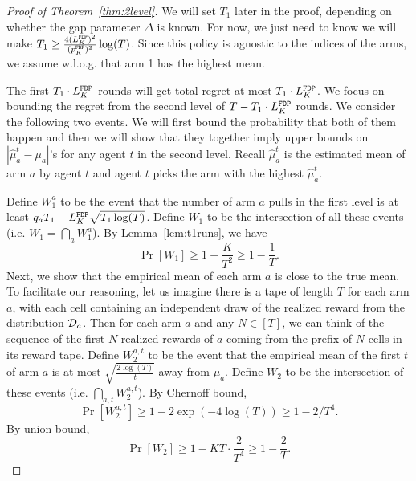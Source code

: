 \begin{proof}[Proof of Theorem~\ref{thm:2level}]
  We will set $T_1$ later in the proof, depending on whether the gap
  parameter $\Delta$ is known. For now, we just need to know we will
  make $T_1 \geq \frac{4(L^\mathtt{FDP}_K)^2}{(p^\mathtt{FDP}_K)^2}\log(T)$. Since this policy is
  agnostic to the indices of the arms, we assume w.l.o.g. that arm 1
  has the highest mean.

  The first $T_1 \cdot L^\mathtt{FDP}_K$ rounds will get total regret at most
  $T_1 \cdot L^\mathtt{FDP}_K$.  We focus on bounding the regret from the second
  level of $T - T_1 \cdot L^\mathtt{FDP}_K$ rounds. We consider the following two
   events. We will first bound the probability that both of them
  happen and then we will show that they together imply upper bounds
  on $|\hat{\mu}^t_a - \mu_a|$'s for any agent $t$ in the second
  level. Recall $\hat{\mu}^t_a$ is the estimated mean of arm $a$ by
  agent $t$ and agent $t$ picks the arm with the highest
  $\hat{\mu}^t_a$.

  Define $W_1^a$ to be the event that the number of arm $a$ pulls in
  the first level is at least $q_a T_1- L^\mathtt{FDP}_K \sqrt{T_1\log(T)}$.
Define $W_1$ to be the intersection of all these events (i.e. $W_1 = \bigcap_{a}W_1^a$). By Lemma~\ref{lem:t1runs}, we have
\[
\Pr[W_1] \geq 1- \frac{K}{T^2} \geq 1 - \frac{1}{T}.
\]
  Next, we show that the empirical mean of
each arm $a$ is close to the true mean. To facilitate our reasoning,
let us imagine there is a tape of length $T$ for each arm $a$, with
each cell containing an independent draw of the realized reward from
the distribution $\mathcal{D}_a$. Then for each arm $a$ and any $N\in [T]$, we
can think of the sequence of the first $N$ realized rewards of $a$
coming from the prefix of $N$ cells in its reward tape. Define
$W^{a,t}_2$ to be the event that the empirical mean of the first $t$
 of arm $a$ is at most
$\sqrt{\frac{2\log(T)}{t}}$ away from $\mu_a$. Define $W_2$ to be the
intersection of these events (i.e.  $\bigcap_{a,t} W^{a,t}_2$).  By
Chernoff bound,
\[
\Pr[W^{a,t}_2] \geq 1 - 2\exp(-4\log(T)) \geq 1-2/T^4.
\]
By union bound,
\[
\Pr[W_2] \geq 1 - KT \cdot \frac{2}{T^4} \geq 1 - \frac{2}{T}.
\]




\end{proof}
